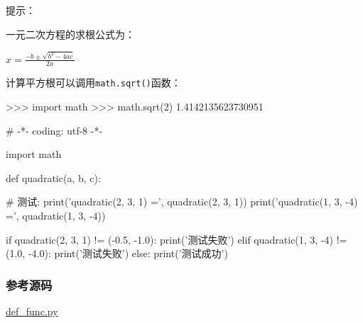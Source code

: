 提示：

一元二次方程的求根公式为：

\(x=\frac{-b\pm\sqrt{b^2-4ac}}{2a}\)

计算平方根可以调用\texttt{math.sqrt()}函数：

\begin{pythoncode}
>>> import math
>>> math.sqrt(2)
1.4142135623730951
\end{pythoncode}

\begin{pythoncode}
# -*- coding: utf-8 -*-

import math

def quadratic(a, b, c):
\end{pythoncode}

\begin{pythoncode}
# 测试:
print('quadratic(2, 3, 1) =', quadratic(2, 3, 1))
print('quadratic(1, 3, -4) =', quadratic(1, 3, -4))

if quadratic(2, 3, 1) != (-0.5, -1.0):
    print('测试失败')
elif quadratic(1, 3, -4) != (1.0, -4.0):
    print('测试失败')
else:
    print('测试成功')
\end{pythoncode}

\hypertarget{ux53c2ux8003ux6e90ux7801}{%
\subsubsection{参考源码}\label{ux53c2ux8003ux6e90ux7801}}

\href{https://github.com/michaelliao/learn-python3/blob/master/samples/function/def_func.py}{def\_func.py}

